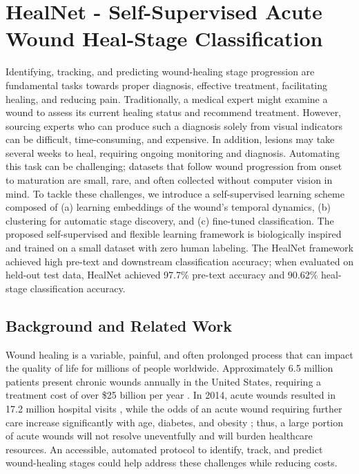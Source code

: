 \documentclass[11pt]{ucthesis}
\begin{document}
\section{HealNet - Self-Supervised Acute Wound Heal-Stage Classification}\label{section:healnet_abs}
Identifying, tracking, and predicting wound-healing stage progression are fundamental tasks towards proper diagnosis, effective treatment, facilitating healing, and reducing pain. Traditionally, a medical expert might examine a wound to assess its current healing status and recommend treatment. However, sourcing experts who can produce such a diagnosis solely from visual indicators can be difficult, time-consuming, and expensive. In addition, lesions may take several weeks to heal, requiring ongoing monitoring and diagnosis. Automating this task can be challenging; datasets that follow wound progression from onset to maturation are small, rare, and often collected without computer vision in mind. To tackle these challenges, we introduce a self-supervised learning scheme composed of (a) learning embeddings of the wound's temporal dynamics, (b) clustering for automatic stage discovery, and (c) fine-tuned classification. The proposed self-supervised and flexible learning framework is biologically inspired and trained on a small dataset with zero human labeling. The HealNet framework achieved high pre-text and downstream classification accuracy; when evaluated on held-out test data, HealNet achieved 97.7\% pre-text accuracy and 90.62\% heal-stage classification accuracy.

\subsection{Background and Related Work}
Wound healing is a variable, painful, and often prolonged process that can impact the quality of life for millions of people worldwide. Approximately 6.5 million patients present chronic wounds annually in the United States, requiring a treatment cost of over \$25 billion per year \cite{sen2009human}. In 2014, acute wounds resulted in 17.2 million hospital visits \cite{steiner2020surgeries}, while the odds of an acute wound requiring further care increase significantly with age, diabetes, and obesity \cite{sen2009human}; thus, a large portion of acute wounds will not resolve uneventfully and will burden healthcare resources. An accessible, automated protocol to identify, track, and predict wound-healing stages could help address these challenges while reducing costs.
\end{document}

